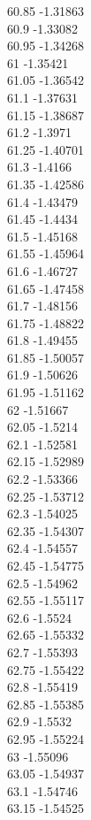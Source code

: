 {60.85	-1.31863\\
60.9	-1.33082\\
60.95	-1.34268\\
61	-1.35421\\
61.05	-1.36542\\
61.1	-1.37631\\
61.15	-1.38687\\
61.2	-1.3971\\
61.25	-1.40701\\
61.3	-1.4166\\
61.35	-1.42586\\
61.4	-1.43479\\
61.45	-1.4434\\
61.5	-1.45168\\
61.55	-1.45964\\
61.6	-1.46727\\
61.65	-1.47458\\
61.7	-1.48156\\
61.75	-1.48822\\
61.8	-1.49455\\
61.85	-1.50057\\
61.9	-1.50626\\
61.95	-1.51162\\
62	-1.51667\\
62.05	-1.5214\\
62.1	-1.52581\\
62.15	-1.52989\\
62.2	-1.53366\\
62.25	-1.53712\\
62.3	-1.54025\\
62.35	-1.54307\\
62.4	-1.54557\\
62.45	-1.54775\\
62.5	-1.54962\\
62.55	-1.55117\\
62.6	-1.5524\\
62.65	-1.55332\\
62.7	-1.55393\\
62.75	-1.55422\\
62.8	-1.55419\\
62.85	-1.55385\\
62.9	-1.5532\\
62.95	-1.55224\\
63	-1.55096\\
63.05	-1.54937\\
63.1	-1.54746\\
63.15	-1.54525\\
}
